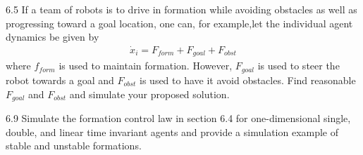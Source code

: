 \documentclass{article}
\begin{document}
\begin{problem}6.5
    If a team of robots is to drive in formation while avoiding obstacles as well as progressing toward a goal location, one can, for example,let the individual agent dynamics be given by
    \begin{align*}
        \dot x_i = F_{form} + F_{goal} + F_{obst}
    \end{align*}
    where $f_{form}$ is used to maintain formation. However, $F_{goal}$ is used to steer the robot towards a goal and $F_{obst}$ is used to have it avoid obstacles. Find reasonable $F_{goal}$ and $F_{obst}$ and simulate your proposed solution. 
\end{problem}
\begin{problem} 6.9
    Simulate the formation control law in section 6.4 for one-dimensional
    single, double, and linear time invariant agents and provide a simulation example of stable and unstable formations.
\end{problem}
\end{document}
